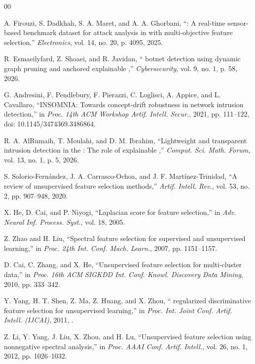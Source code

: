 \begin{thebibliography}{00}

A. Firouzi, S. Dadkhah, S. A. Maret, and A. A. Ghorbani, ``: A real-time sensor-based benchmark dataset for attack analysis in  with multi-objective feature selection,'' \emph{Electronics}, vol. 14, no. 20, p. 4095, 2025.

R. Esmaeilyfard, Z. Shoaei, and R. Javidan, `` botnet detection using dynamic graph pruning and anchored explainable ,'' \emph{Cybersecurity}, vol. 9, no. 1, p. 58, 2026.

G. Andresini, F. Pendlebury, F. Pierazzi, C. Loglisci, A. Appice, and L. Cavallaro, ``INSOMNIA: Towards concept-drift robustness in network intrusion detection,'' in \emph{Proc. 14th ACM Workshop Artif. Intell. Secur.}, 2021, pp. 111--122, doi: 10.1145/3474369.3486864.

R. A. AlRumaih, T. Moulahi, and D. M. Ibrahim, ``Lightweight and transparent intrusion detection in the : The role of explainable ,'' \emph{Comput. Sci. Math. Forum}, vol. 13, no. 1, p. 5, 2026.

S. Solorio-Fern\'andez, J. A. Carrasco-Ochoa, and J. F. Mart\'inez-Trinidad, ``A review of unsupervised feature selection methods,'' \emph{Artif. Intell. Rev.}, vol. 53, no. 2, pp. 907--948, 2020.

X. He, D. Cai, and P. Niyogi, ``Laplacian score for feature selection,'' in \emph{Adv. Neural Inf. Process. Syst.}, vol. 18, 2005.

Z. Zhao and H. Liu, ``Spectral feature selection for supervised and unsupervised learning,'' in \emph{Proc. 24th Int. Conf. Mach. Learn.}, 2007, pp. 1151--1157.

D. Cai, C. Zhang, and X. He, ``Unsupervised feature selection for multi-cluster data,'' in \emph{Proc. 16th ACM SIGKDD Int. Conf. Knowl. Discovery Data Mining}, 2010, pp. 333--342.

Y. Yang, H. T. Shen, Z. Ma, Z. Huang, and X. Zhou, `` regularized discriminative feature selection for unsupervised learning,'' in \emph{Proc. Int. Joint Conf. Artif. Intell. (IJCAI)}, 2011, .

Z. Li, Y. Yang, J. Liu, X. Zhou, and H. Lu, ``Unsupervised feature selection using nonnegative spectral analysis,'' in \emph{Proc. AAAI Conf. Artif. Intell.}, vol. 26, no. 1, 2012, pp. 1026--1032.


\end{thebibliography}
